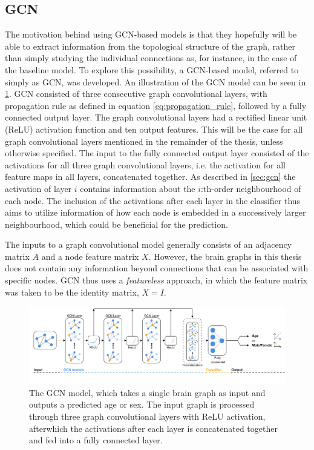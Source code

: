 \subsection{GCN}

The motivation behind using GCN-based models is that they hopefully will be able to extract information from the topological structure of the graph, rather than simply studying the individual connections as, for instance, in the case of the baseline model. To explore this possibility, a GCN-based model, referred to simply as GCN, was developed. An illustration of the GCN model can be seen in \cref{fig:gcn_base}. GCN consisted of three consecutive graph convolutional layers, with propagation rule as defined in equation \eqref{eq:propagation_rule}, followed by a fully connected output layer. The graph convolutional layers had a rectified linear unit (ReLU) activation function and ten output features. This will be the case for all graph convolutional layers mentioned in the remainder of the thesis, unless otherwise specified. The input to the fully connected output layer consisted of the activations for all three graph convolutional layers, i.e. the activation for all feature maps in all layers, concatenated together. As described in \cref{sec:gcn} the activation of layer $i$ contains information about the $i$:th-order neighbourhood of each node. The inclusion of the activations after each layer in the classifier thus aims to utilize information of how each node is embedded in a successively larger neighbourhood, which could be beneficial for the prediction.

The inputs to a graph convolutional model generally consists of an adjacency matrix $A$ and a node feature matrix $X$. However, the brain graphs in this thesis does not contain any information beyond connections that can be associated with specific nodes. GCN thus uses a \textit{featureless} approach, in which the feature matrix was taken to be the identity matrix, $X=I$.

%         

\begin{figure}[H]
    \centering
    \includegraphics[width=\textwidth]{chapters/images_methods/base_v2.png}
    \caption{The GCN model, which takes a single brain graph as input and outputs a predicted age or sex. The input graph is processed through three graph convolutional layers with ReLU activation, afterwhich the activations after each layer is concatenated together and fed into a fully connected layer.}
    \label{fig:gcn_base}
\end{figure}


